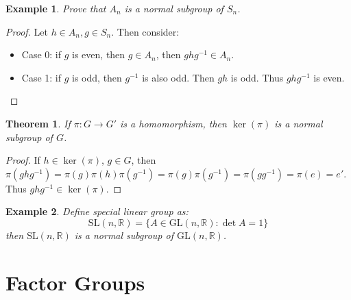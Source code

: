 \documentclass{article}
\theoremstyle{MyNonumberplain}
\theoremstyle{break}
\newtheorem*{proof}{Proof. }
\newcommand{\tmop}{\text}
\theoremstyle{break}
\newtheorem{theorem}{Theorem}[section]
\newtheorem{example}{Example}[section]
\theoremstyle{break}
\theoremstyle{definition}
\theoremstyle{break}
\begin{document}
\begin{expbox}
    \begin{example}
        Prove that $A_n$ is a normal subgroup of $S_n$. 
    \end{example}
    \begin{prfbox}
        \begin{proof}
            Let $h \in A_n, g \in S_n$. Then consider:\bigskip
            \begin{itemize}
            \item Case 0: if $g$ is even, then $g \in A_n$, then $g h g^{- 1} \in A_n$.\bigskip
            
            \item Case 1: if $g$ is odd, then $g^{- 1}$ is also odd. Then $g h$ is odd.
            Thus $g h g^{- 1}$ is even. 
            \end{itemize}
        \end{proof}
    \end{prfbox}
\end{expbox}

\begin{thmbox}
    \begin{theorem}
        If $\pi : G \rightarrow G'$ is a homomorphism, then $\ker (\pi)$ is a normal
        subgroup of $G$. 
    \end{theorem}
    \begin{prfbox}
        \begin{proof}
            If $h \in \ker (\pi)$, $g \in G$, then $\pi (g h g^{- 1}) = \pi (g) \pi (h)
            \pi (g^{- 1}) = \pi (g) \pi (g^{- 1}) = \pi (g g^{- 1}) = \pi (e) = e'$. Thus $g h g^{- 1} \in \ker (\pi)$.
        \end{proof}
    \end{prfbox}
\end{thmbox}

\begin{expbox}
    \begin{example}
        Define special linear group as:
        \[ \tmop{SL} (n, \mathbb{R}) = \{ A \in \tmop{GL} (n, \mathbb{R}) : \det A = 1
        \} \]
        then $\tmop{SL} (n, \mathbb{R})$ is a normal subgroup of $\tmop{GL} (n,
        \mathbb{R})$.
    \end{example}
\end{expbox}

\newpage

\section{Factor Groups}
\end{document}
